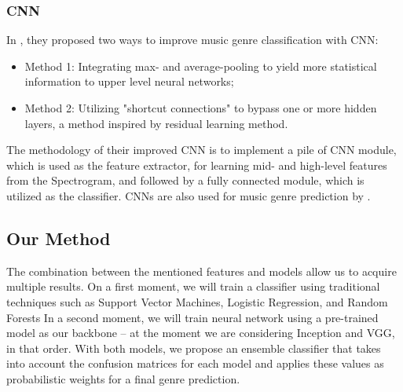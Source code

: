 \subsubsection{CNN}

In \citet{Zhang2016}, they proposed two ways to improve music genre classification with CNN:

\begin{itemize}
    \item Method 1: Integrating max- and average-pooling to yield more statistical information to upper level neural networks;
    \item Method 2: Utilizing "shortcut connections" to bypass one or more hidden layers, a method inspired by residual learning method.
\end{itemize}

The methodology of their improved CNN is to implement a pile of CNN module, which is used as the feature extractor, for learning mid- and high-level features from the Spectrogram, and followed by a fully connected module, which is utilized as the classifier. CNNs are also used for music genre prediction by \citet{Bahuleyan2018}.

\subsection{Our Method}

The combination between the mentioned features and models allow us to acquire multiple results. On a first moment, we will train a classifier using traditional techniques such as Support Vector Machines, Logistic Regression, and Random Forests  In a second moment, we will train neural network using a pre-trained model as our backbone -- at the moment we are considering Inception and VGG, in that order. With both models, we propose an ensemble classifier that takes into account the confusion matrices for each model and applies these values as probabilistic weights for a final genre prediction.

